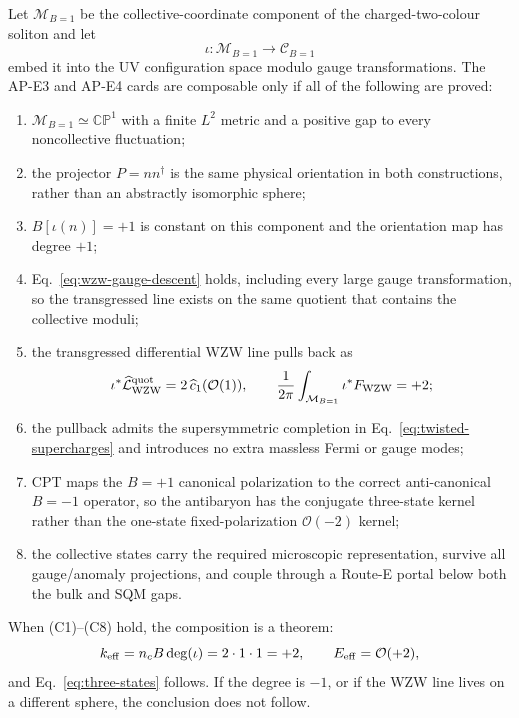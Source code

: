 \documentclass[11pt]{article}
\theoremstyle{definition}
\theoremstyle{remark}
\newcommand{\CP}{\mathbb {CP}}
\newcommand{\cO}{\mathcal O}
\newcommand{\cM}{\mathcal M}
\newcommand{\cC}{\mathcal C}
\begin{document}
Let \(\cM_{B=1}\) be the collective-coordinate component of the
charged-two-colour soliton and let
\begin{equation}
 \iota:\cM_{B=1}\longrightarrow\cC_{B=1}
 \label{eq:collective-embedding}
\end{equation}
embed it into the UV configuration space modulo gauge transformations.
The AP-E3 and AP-E4 cards are composable only if all of the following are
proved:
\begin{enumerate}[label=(C\arabic*)]
\item \(\cM_{B=1}\simeq\CP^1\) with a finite \(L^2\) metric and a positive
  gap to every noncollective fluctuation;
\item the projector \(P=nn^\dagger\) is the same physical orientation in
  both constructions, rather than an abstractly isomorphic sphere;
\item \(B[\iota(n)]=+1\) is constant on this component and the orientation
  map has degree \(+1\);
\item Eq.~\eqref{eq:wzw-gauge-descent} holds, including every large gauge
  transformation, so the transgressed line exists on the same quotient that
  contains the collective moduli;
\item the transgressed differential WZW line pulls back as
\begin{equation}
 \iota^*\widehat{\mathcal L}_{\rm WZW}^{\rm quot}
 =2\,\widehat c_1(\cO(1)),
 \qquad
 \frac1{2\pi}\int_{\cM_{B=1}}\iota^*F_{\rm WZW}=+2;
 \label{eq:signed-pullback}
\end{equation}
\item the pullback admits the supersymmetric completion in
  Eq.~\eqref{eq:twisted-supercharges} and introduces no extra massless Fermi or
  gauge modes;
\item CPT maps the \(B=+1\) canonical polarization to the correct
  anti-canonical \(B=-1\) operator, so the antibaryon has the conjugate
  three-state kernel rather than the one-state fixed-polarization
  \(\cO(-2)\) kernel;
\item the collective states carry the required microscopic representation,
  survive all gauge/anomaly projections, and couple through a Route-E portal
  below both the bulk and SQM gaps.
\end{enumerate}
When (C1)--(C8) hold, the composition is a theorem:
\begin{equation}
 k_{\rm eff}=n_cB\deg(\iota)=2\cdot1\cdot1=+2,
 \qquad E_{\rm eff}=\cO(+2),
 \label{eq:conditional-composition}
\end{equation}
and Eq.~\eqref{eq:three-states} follows.  If the degree is \(-1\), or if the
WZW line lives on a different sphere, the conclusion does not follow.
\end{document}
